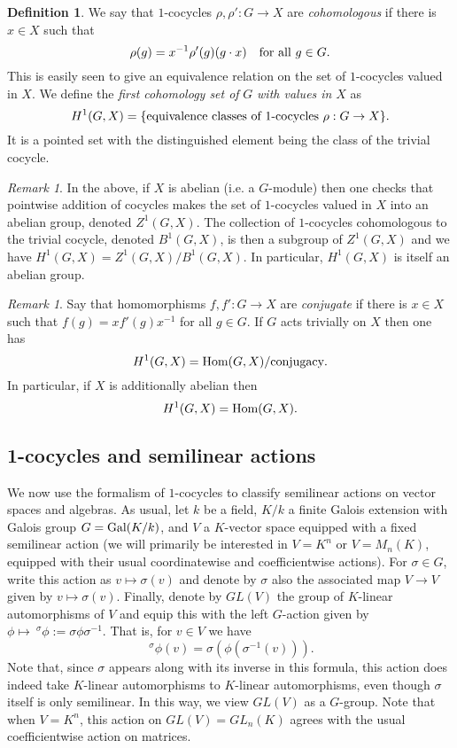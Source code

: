 \documentclass[11pt]{amsart}
\numberwithin{equation}{section}
\theoremstyle{remark}
\newtheorem{remark}[equation]{Remark}
\theoremstyle{remark}
\theoremstyle{remark}
\theoremstyle{definition}
\theoremstyle{definition}
\theoremstyle{definition}
\newtheorem{defi}[equation]{Definition}
\theoremstyle{definition}
\theoremstyle{definition}
\theoremstyle{definition}
\begin{document}
\begin{defi} \label{non-abelian h1 defi}
We say that $1$-cocycles $\rho,\rho':G\rightarrow X$ are \textit{cohomologous} if there is $x\in X$ such that
\[\rho(g)=x^{-1}\rho'(g)(g \cdot x)~~\textup{ for all }g\in G.\]
 This is easily seen to give an equivalence relation on the set of $1$-cocycles valued in $X$. 
We define the \emph{first cohomology set of }$G$ \emph{with values in }$X$ as
\[H^1(G,X)=\{\textup{equivalence classes of }1\textup{-cocycles }\rho:G\rightarrow X\}.\]
It is a pointed set with the distinguished element being the class of the trivial cocycle.
\end{defi}

\begin{remark}
In the above, if $X$ is abelian (i.e. a $G$-module) then one checks that pointwise addition of cocycles makes the set of $1$-cocycles valued in $X$ into an abelian group, denoted $Z^1(G,X)$. The collection of $1$-cocycles cohomologous to the trivial cocycle, denoted $B^1(G,X)$, is then a subgroup of $Z^1(G,X)$ and we have $H^1(G,X)=Z^1(G,X)/B^1(G,X)$. In particular, $H^1(G,X)$ is itself an abelian group. 
\end{remark}

\begin{remark}
Say that homomorphisms $f,f':G\rightarrow X$ are \textit{conjugate} if there is $x\in X$ such that $f(g)=xf'(g)x^{-1}$ for all $g\in G$. If $G$ acts trivially on $X$ then one has
\[H^1(G,X)=\textup{Hom}(G,X)/\textup{conjugacy}.\]
In particular, if $X$ is additionally abelian then 
\[H^1(G,X)=\textup{Hom}(G,X).\]
\end{remark}

\subsection{1-cocycles and semilinear actions}

We now use the formalism of $1$-cocycles to classify semilinear actions on vector spaces and algebras. As usual, let $k$ be a field, $K/k$ a finite Galois extension with Galois group $G=\textup{Gal}(K/k)$, and $V$ a  $K$-vector space equipped with a fixed semilinear action (we will primarily be interested in $V=K^n$ or $V=M_n(K)$, equipped with their usual coordinatewise and coefficientwise actions). For $\sigma \in G$, write this action as $v\mapsto \sigma(v)$ and denote by $\sigma$ also the associated map $V\rightarrow V$ given by $v\mapsto\sigma(v)$. Finally, denote by $GL(V)$ the group of $K$-linear automorphisms of $V$ and equip this with the left $G$-action given by $\phi \mapsto ~^\sigma\phi:=\sigma \phi \sigma^{-1}$. That is,  for $v\in V$ we have
\[~^\sigma \phi(v)=\sigma(\phi(\sigma^{-1}(v))).\]
Note that, since $\sigma$ appears along with its inverse in this formula, this action does indeed take $K$-linear automorphisms to $K$-linear automorphisms, even though $\sigma$  itself is only semilinear. In this way, we view $GL(V)$ as a $G$-group. Note that when $V=K^n$, this action on $GL(V)=GL_n(K)$ agrees with the usual coefficientwise action on matrices.
\end{document}
